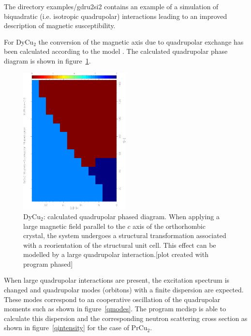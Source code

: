 The directory {\prg examples/gdru2si2} contains an example of a simulation of biquadratic (i.e. isotropic %
quadrupolar) interactions leading to an improved description of magnetic susceptibility.

For DyCu$_2$ the conversion
of the magnetic axis due to quadrupolar exchange has been calculated according to the model 
\cite{yoshida98-1421}. The calculated quadrupolar phase diagram is shown in figure~\ref{qphased}.

\begin{figure}[hb]%
\begin{center}\leavevmode
\includegraphics[angle=-90, width=0.5\textwidth]{./figsrc/dyphased.ps}
\end{center}
\caption{DyCu$_2$: calculated quadrupolar phased diagram. When applying a large magnetic field
parallel to the $c$ axis of the orthorhombic crystal, the system undergoes a structural transformation
associated with a reorientation of the structural unit cell. This effect can be modelled by a large
quadrupolar interaction.[plot created with program {\prg phased}]}
\label{qphased}
\end{figure}

When large  quadrupolar interactions are present, the excitation spectrum is changed and
quadrupolar modes (orbitons) with a finite dispersion are expected. 
These modes correspond to an cooperative oscillation of the quadrupolar moments such as shown
in figure~\ref{qmodes}.
The program {\prg mcdisp}
is able to calculate this dispersion and the corresponding neutron scattering cross section as shown
in figure~\ref{qintensity} for the case of PrCu$_2$. 
 

